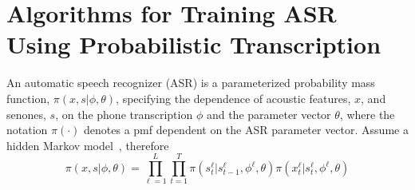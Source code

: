 \section{Algorithms for Training ASR Using Probabilistic Transcription}


An automatic speech recognizer (ASR) is a parameterized probability
mass function, $\pi(x,s|\phi,\theta)$, specifying the dependence of
acoustic features, $x$, and senones, $s$, on the phone transcription
$\phi$ and the parameter vector $\theta$, where the notation
$\pi(\cdot)$ denotes a pmf dependent on the ASR parameter vector.  
Assume a hidden Markov model~\cite{Baker75}, therefore
\[
\pi(x,s|\phi,\theta)=\prod_{\ell=1}^L \prod_{t=1}^T
\pi(s_t^\ell|s_{t-1}^\ell,\phi^\ell,\theta)\pi(x_t^\ell|s_t^\ell,\phi^\ell,\theta)
\]
